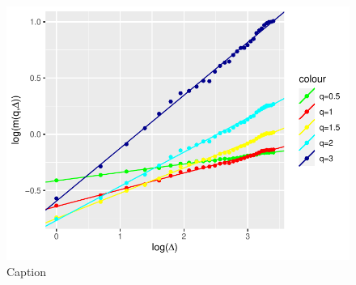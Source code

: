 \begin{figure}[H]
    \centering
    \includegraphics[scale=0.8]{fig/img/RealizedLib/LinearReg.pdf}
    \caption{Caption}
    \label{fig:enter-label}
\end{figure}
